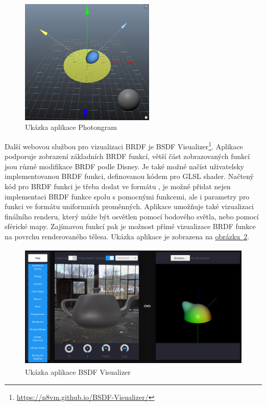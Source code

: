 \documentclass[czech,master]{diploma}
\newcommand{\appH}{6cm}
\begin{document}
\begin{figure}[ht]
  \centering
  \includegraphics[height=\appH]{Figures/photongram.png}
  \caption[Ukázka aplikace Photongram]{Ukázka aplikace Photongram}%
  \label{fig:photongramApp}%
\end{figure}


Další webovou službou pro vizualizaci BRDF je BSDF Visualizer\footnote{\url{https://n8vm.github.io/BSDF-Visualizer/}}. Aplikace podporuje zobrazení základních BRDF funkcí, větší část zobrazovaných funkcí jsou různé modifikace BRDF podle Disney. Je také možné načíst uživatelsky implementovanou BRDF funkci, definovanou kódem pro GLSL shader. Načtený kód pro BRDF funkci je třeba dodat ve formátu , je možné přidat nejen implementaci BRDF funkce spolu s pomocnými funkcemi, ale i parametry pro funkci ve formátu uniformních proměnných. Aplikace umožňuje také vizualizaci finálního renderu, který může být osvětlen pomocí bodového světla, nebo pomocí sférické mapy. Zajímavou funkcí pak je možnost přímé vizualizace BRDF funkce na povrchu renderovaného tělesa. Ukázka aplikace je zobrazena na \hyperref[fig:bsdfVizApp]{obrázku~\ref{fig:bsdfVizApp}}.

\begin{figure}[ht]
  \centering
  \includegraphics[height=\appH]{Figures/BSDFvisApp.png}
  \caption{Ukázka aplikace BSDF Visualizer}%
  \label{fig:bsdfVizApp}%
\end{figure}
\end{document}
